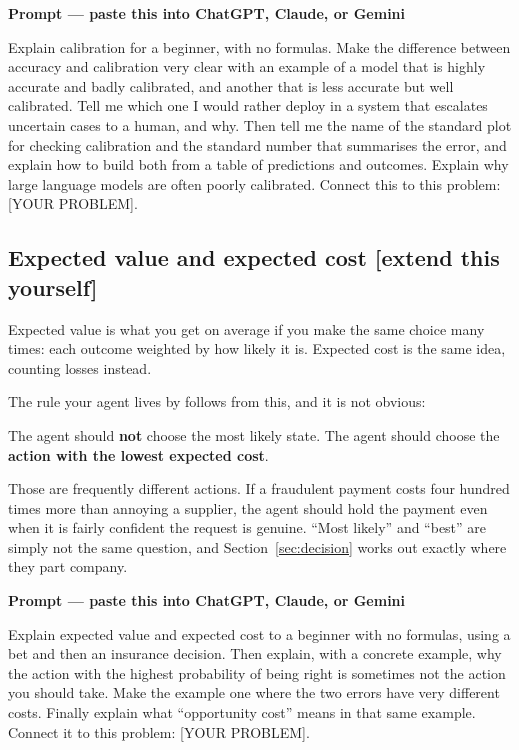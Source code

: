 \documentclass[11pt,a4paper]{article}
\newcommand{\boxtitle}[1]{{\bfseries #1}\par\vspace{2pt}}
\newcommand{\taught}{\hfill{\footnotesize\sffamily\color{sbaccent}[extend this yourself]}}
\newenvironment{learnprompt}
  {\begin{sbbox}\boxtitle{Prompt --- paste this into ChatGPT, Claude, or Gemini}%
   \ttfamily\small\raggedright}
  {\end{sbbox}}
\begin{document}
\begin{learnprompt}
Explain calibration for a beginner, with no formulas. Make the difference between accuracy and
calibration very clear with an example of a model that is highly accurate and badly calibrated,
and another that is less accurate but well calibrated. Tell me which one I would rather deploy in
a system that escalates uncertain cases to a human, and why. Then tell me the name of the standard
plot for checking calibration and the standard number that summarises the error, and explain how
to build both from a table of predictions and outcomes. Explain why large language models are
often poorly calibrated. Connect this to this problem: [YOUR PROBLEM].
\end{learnprompt}

\subsection{Expected value and expected cost \taught}

Expected value is what you get on average if you make the same choice many times: each outcome
weighted by how likely it is. Expected cost is the same idea, counting losses instead.

The rule your agent lives by follows from this, and it is not obvious:

\begin{sbrule}
The agent should \textbf{not} choose the most likely state.
The agent should choose the \textbf{action with the lowest expected cost}.
\end{sbrule}

Those are frequently different actions. If a fraudulent payment costs four hundred times more
than annoying a supplier, the agent should hold the payment even when it is fairly confident the
request is genuine. ``Most likely'' and ``best'' are simply not the same question, and
Section~\ref{sec:decision} works out exactly where they part company.

\begin{learnprompt}
Explain expected value and expected cost to a beginner with no formulas, using a bet and then an
insurance decision. Then explain, with a concrete example, why the action with the highest
probability of being right is sometimes not the action you should take. Make the example one
where the two errors have very different costs. Finally explain what ``opportunity cost'' means
in that same example. Connect it to this problem: [YOUR PROBLEM].
\end{learnprompt}
\end{document}
